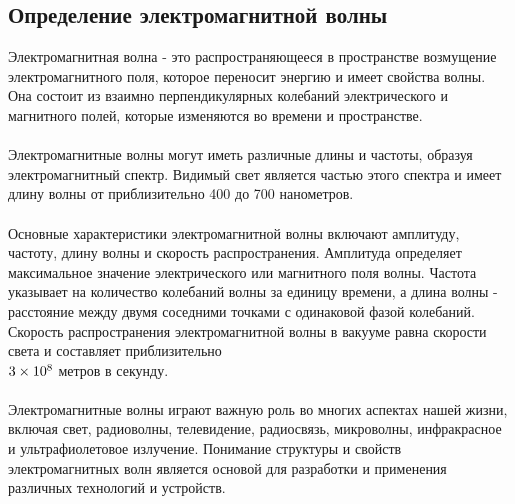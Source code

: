 \documentclass{article}
\begin{document}
\subsection{Определение электромагнитной волны}
Электромагнитная волна - это распространяющееся в пространстве возмущение электромагнитного поля, которое переносит энергию и имеет свойства волны. Она состоит из взаимно перпендикулярных колебаний электрического и магнитного полей, которые изменяются во времени и пространстве.\\
~\\
Электромагнитные волны могут иметь различные длины и частоты, образуя электромагнитный спектр. Видимый свет является частью этого спектра и имеет длину волны от приблизительно 400 до 700 нанометров.\\
~\\
Основные характеристики электромагнитной волны включают амплитуду, частоту, длину волны и скорость распространения. Амплитуда определяет максимальное значение электрического или магнитного поля волны. Частота указывает на количество колебаний волны за единицу времени, а длина волны - расстояние между двумя соседними точками с одинаковой фазой колебаний. Скорость распространения электромагнитной волны в вакууме равна скорости света и составляет приблизительно \\$3 \times 10^8\\$ метров в секунду.\\
~\\
Электромагнитные волны играют важную роль во многих аспектах нашей жизни, включая свет, радиоволны, телевидение, радиосвязь, микроволны, инфракрасное и ультрафиолетовое излучение. Понимание структуры и свойств электромагнитных волн является основой для разработки и применения различных технологий и устройств.
\end{document}
